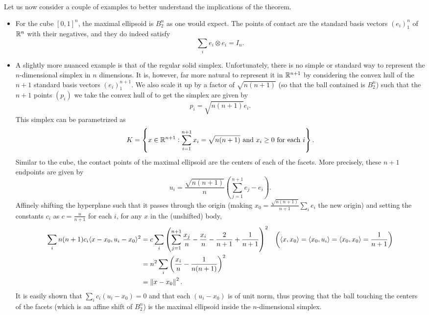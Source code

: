Let us now consider a couple of examples to better understand the implications of the theorem.

\begin{itemize}
    \item For the cube $[0,1]^n$, the maximal ellipsoid is $B_2^n$ as one would expect. The points of contact are the standard basis vectors $(e_i)_1^n$ of $\mathbb{R}^n$ with their negatives, and they do indeed satisfy
    \[ \sum_i e_i\otimes e_i = I_n. \]
    
    \item A slightly more nuanced example is that of the regular solid simplex. Unfortunately, there is no simple or standard way to represent the $n$-dimensional simplex in $n$ dimensions. It is, however, far more natural to represent it in $\mathbb{R}^{n+1}$ by considering the convex hull of the $n+1$ standard basis vectors $(e_i)_1^{n+1}$. We also scale it up by a factor of $\sqrt{n(n+1)}$ (so that the ball contained is $B_2^n$) such that the $n+1$ points $(p_i)$ we take the convex hull of to get the simplex are given by 
    \[ p_i = \sqrt{n(n+1)}e_i. \]
    This simplex can be parametrized as
    \[ K=\left\{x\in\mathbb{R}^{n+1}: \sum_{i=1}^{n+1} x_i = \sqrt{n(n+1)}\text{ and }x_i\geq 0\text{ for each }i\right\}. \]
    Similar to the cube, the contact points of the maximal ellipsoid are the centers of each of the facets. More precisely, these $n+1$ endpoints are given by
    \[ u_i = \frac{\sqrt{n(n+1)}}{n}\left(\sum_{j=1}^{n+1} e_j - e_i\right). \]
    Affinely shifting the hyperplane such that it passes through the origin (making $x_0=\frac{\sqrt{n(n+1)}}{n+1}\sum_i e_i$ the new origin) and
    setting the constants $c_i$ as $c=\frac{n}{n+1}$ for each $i$, for any $x$ in the (unshifted) body,
    \begin{align*}
        \sum_i n(n+1)c_i\langle x-x_0,u_i-x_0\rangle^2 &= c \sum_i \left( \sum_{j=1}^{n+1} \frac{x_j}{n} - \frac{x_i}{n} - \frac{2}{n+1} + \frac{1}{n+1} \right)^2 & \left(\langle x,x_0\rangle = \langle x_0,u_i\rangle = \langle x_0,x_0\rangle = \frac{1}{n+1}\right) \\
        &= n^2 \sum_i \left( \frac{x_i}{n} - \frac{1}{n(n+1)} \right)^2 \\
        &= \left\lVert x-x_0\right\rVert^2.
    \end{align*}
    It is easily shown that $\sum_i c_i (u_i - x_0) = 0$ and that each $(u_i-x_0)$ is of unit norm, thus proving that the ball touching the centers of the facets (which is an affine shift of $B_2^n$) is the maximal ellipsoid inside the $n$-dimensional simplex.\\
\end{itemize}

